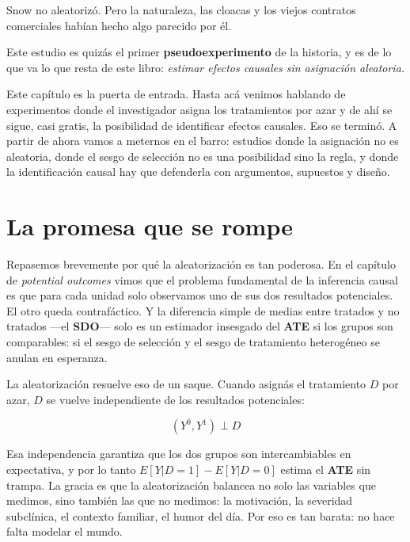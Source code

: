 \documentclass[
  letterpaper,
  DIV=11,
  numbers=noendperiod,
  oneside]{scrreprt}
\begin{document}
Snow no aleatorizó. Pero la naturaleza, las cloacas y los viejos
contratos comerciales habían hecho algo parecido por él.

Este estudio es quizás el primer \textbf{pseudoexperimento} de la
historia, y es de lo que va lo que resta de este libro: \emph{estimar
efectos causales sin asignación aleatoria.}

Este capítulo es la puerta de entrada. Hasta acá venimos hablando de
experimentos donde el investigador asigna los tratamientos por azar y de
ahí se sigue, casi gratis, la posibilidad de identificar efectos
causales. Eso se terminó. A partir de ahora vamos a meternos en el
barro: estudios donde la asignación no es aleatoria, donde el sesgo de
selección no es una posibilidad sino la regla, y donde la identificación
causal hay que defenderla con argumentos, supuestos y diseño.

\hypertarget{la-promesa-que-se-rompe}{%
\section{La promesa que se rompe}\label{la-promesa-que-se-rompe}}

Repasemos brevemente por qué la aleatorización es tan poderosa. En el
capítulo de \emph{potential outcomes} vimos que el problema fundamental
de la inferencia causal es que para cada unidad solo observamos uno de
sus dos resultados potenciales. El otro queda contrafáctico. Y la
diferencia simple de medias entre tratados y no tratados ---el
\textbf{SDO}--- solo es un estimador insesgado del \textbf{ATE} si los
grupos son comparables: si el sesgo de selección y el sesgo de
tratamiento heterogéneo se anulan en esperanza.

La aleatorización resuelve eso de un saque. Cuando asignás el
tratamiento \(D\) por azar, \(D\) se vuelve independiente de los
resultados potenciales:

\[
(Y^0, Y^1) \perp D
\]

Esa independencia garantiza que los dos grupos son intercambiables en
expectativa, y por lo tanto \(E[Y|D=1] - E[Y|D=0]\) estima el
\textbf{ATE} sin trampa. La gracia es que la aleatorización balancea no
solo las variables que medimos, sino también las que no medimos: la
motivación, la severidad subclínica, el contexto familiar, el humor del
día. Por eso es tan barata: no hace falta modelar el mundo.
\end{document}
